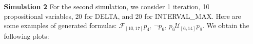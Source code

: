 \documentclass[runningheads]{llncs}
\begin{document}

\vspace{\baselineskip}
\noindent\textbf{Simulation 2}
For the second simulation, we consider 1 iteration, 10 propositional variables, 20 for DELTA, and 20 for INTERVAL\_MAX. Here are some examples of generated formulas:
$\mathcal{F}_{[10,17]} p_4$, $\neg p_6$, $p_6 \mathcal{U}_{[6,14]} p_8$. We obtain the following plots:

\end{document}

